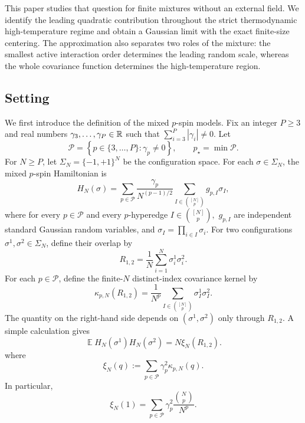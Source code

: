 \documentclass[letterpaper,11pt,reqno]{amsart}
\renewcommand{\geq}{\geqslant}
\newcommand{\abs}[1]{\left\vert#1\right\vert}
\newcommand{\cP}{\mathcal{P}}\newcommand{\cQ}{\mathcal{Q}}\newcommand{\cR}{\mathcal{R}}
\DeclareMathOperator{\E}{\mathds{E}}
\begin{document}
This paper studies that question for finite mixtures without an external
field. We identify the leading quadratic contribution throughout the
strict thermodynamic high-temperature regime and obtain a Gaussian limit
with the exact finite-size centering. The approximation also separates
two roles of the mixture: the smallest active interaction order determines
the leading random scale, whereas the whole covariance function determines
the high-temperature region.

\subsection{Setting}
\label{subsec:setting}
We first introduce the definition of the mixed $p$-spin models. Fix an integer $P\geq 3$ and real numbers
\(
\gamma_3,\ldots,\gamma_{P } \in \mathbb{R}
\)
such that $\sum_{i=3}^{P} \abs{\gamma_i} \neq 0$.  Let
\begin{equation}
\cP
=
\left\{
p\in\{3,\ldots,P\}:\gamma_p\neq 0
\right\},
\qquad
p_\star
=
\min\cP.
\label{eq:active-degrees}
\end{equation}
For $N\geq P$, let
\(
\Sigma_N=\{-1,+1\}^N
\) be the configuration space.
For each $\sigma \in \Sigma_N$, the mixed $p$-spin Hamiltonian is 
\begin{equation}
H_N(\sigma)
=
\sum_{p\in\cP}
\frac{\gamma_p}{N^{(p-1)/2}}
\sum_{I\in\binom{[N]}{p}}
g_{p,I}\sigma_I,
\label{eq:Hamiltonian}
\end{equation}
where for every $p\in\cP$ and every $p$-hyperedge
\(
I\in\binom{[N]}{p},
\)
 $g_{p,I}$ are independent standard Gaussian random variables, and 
\(\sigma_I=\prod_{i\in I}\sigma_i.
\) For two configurations
$\sigma^1,\sigma^2\in\Sigma_N$, define their overlap by
\begin{equation}
R_{1,2}
=
\frac1N
\sum_{i=1}^N
\sigma_i^1\sigma_i^2.
\label{eq:overlap}
\end{equation}
For each $p\in\cP$, define the finite-$N$ distinct-index covariance
kernel by
\begin{equation}
\kappa_{p,N}(R_{1,2})
=
\frac1{N^p}
\sum_{I\in\binom{[N]}p}
\sigma_I^1\sigma_I^2.
\label{eq:kappa-pN}
\end{equation}
The quantity on the right-hand side depends on
$(\sigma^1,\sigma^2)$ only through $R_{1,2}$. A simple calculation gives
\begin{equation}
\E H_N(\sigma^1)H_N(\sigma^2)
=
N\xi_N(R_{1,2}).
\label{eq:covariance}
\end{equation}
where
\begin{equation}
\xi_N(q)
:=
\sum_{p\in\cP}
\gamma_p^2\kappa_{p,N}(q).
\label{eq:xi-N}
\end{equation}
In particular,
\begin{equation}
\xi_N(1)
=
\sum_{p\in\cP}
\gamma_p^2
\frac{\binom Np}{N^p}.
\label{eq:xi-N-one}
\end{equation}
\end{document}
